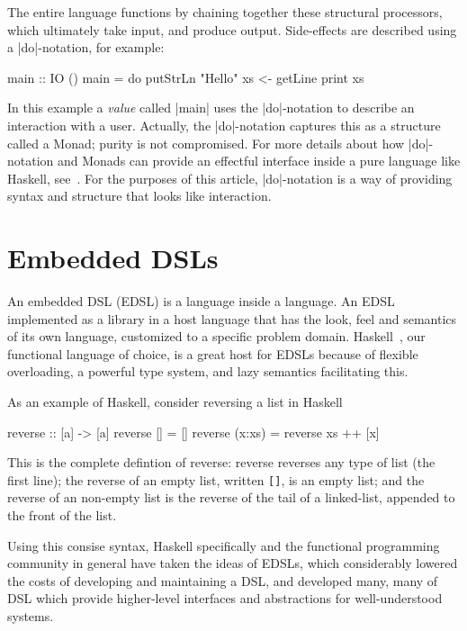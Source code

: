 \documentclass[11pt]{article}
\begin{document}
The entire language
functions by chaining together these structural processors,
which ultimately take input, and produce output. Side-effects
are described using a |do|-notation, for example:

\begin{Code}

main :: IO ()
main = do
  putStrLn "Hello"
  xs <- getLine
  print xs

\end{Code}

In this example a {\em value\/} called |main| uses the |do|-notation to describe
an interaction with a user. Actually, the |do|-notation captures
this as a structure called a Monad; purity is not compromised. For more details
about how |do|-notation and Monads can provide an effectful interface
inside a pure language like Haskell, see~\cite{SPJ:93:IFP}. For the
purposes of this article, |do|-notation is a way of providing syntax
and structure that looks like interaction.




\section{Embedded DSLs}

An embedded DSL (EDSL) is a language inside a language.
An EDSL implemented as a library in a host language
that has the look, feel and semantics of its own language,
customized to a specific problem domain.
Haskell~\cite{Haskell98Book}, our functional language of choice, is a great host for EDSLs
because of flexible overloading, a powerful type system, and lazy semantics facilitating this.

As an example of Haskell, consider reversing a list in Haskell
\begin{Code}
reverse :: [a] -> [a]
reverse []     = []
reverse (x:xs) = reverse xs ++ [x]
\end{Code}

This is the complete defintion of reverse: reverse reverses any type of list (the first line);
the reverse of an empty list, written \verb|[]|, is an empty list;
and the reverse of an non-empty list is the reverse of the tail of a linked-list,
appended to the front of the list.

Using this consise syntax, Haskell specifically and the functional programming
community in general have taken the ideas
of EDSLs, which considerably lowered the costs of developing
and maintaining a DSL, and developed many, many of DSL 
which provide higher-level interfaces and abstractions for well-understood systems.
\end{document}
